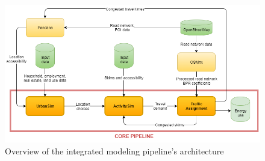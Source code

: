 \begin{figure}[ht]
    \center
    \includegraphics[width=\textwidth]
    {graphics/diagram_pipeline.png}
    \caption{Overview of the integrated modeling pipeline's architecture}
    \label{fig:overview_pipeline_architecture}
\end{figure}




